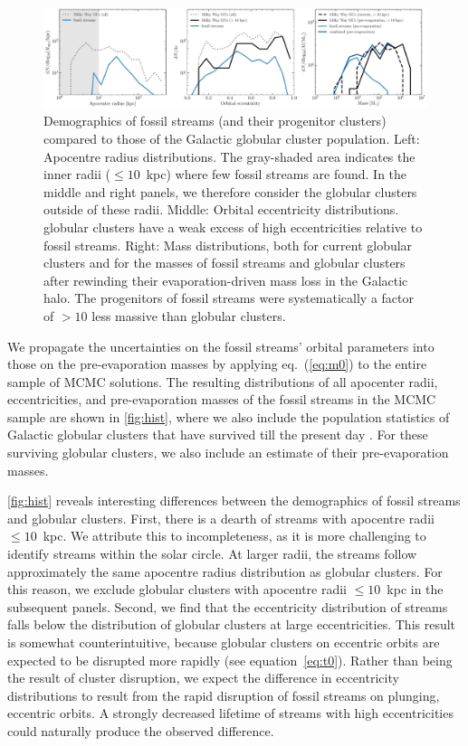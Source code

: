 \documentclass[twocolumn]{aastex63}
\begin{document}
\begin{figure}
\includegraphics[width=\hsize]{figures/distributions_mc.pdf}%
\caption{
\label{fig:hist}
Demographics of fossil streams (and their progenitor clusters) compared to those of the Galactic globular cluster population. Left: Apocentre radius distributions. The gray-shaded area indicates the inner radii ($\leq10$~kpc) where few fossil streams are found. In the middle and right panels, we therefore consider the globular clusters outside of these radii. Middle: Orbital eccentricity distributions. globular clusters have a weak excess of high eccentricities relative to fossil streams. Right: Mass distributions, both for current globular clusters and for the masses of fossil streams and globular clusters after rewinding their evaporation-driven mass loss in the Galactic halo. The progenitors of fossil streams were systematically a factor of $>10$ less massive than globular clusters.}
\end{figure}	
We propagate the uncertainties on the fossil streams' orbital parameters into those on the pre-evaporation masses by applying eq.~(\ref{eq:m0}) to the entire sample of MCMC solutions. The resulting distributions of all apocenter radii, eccentricities, and pre-evaporation masses of the fossil streams in the MCMC sample are shown in \autoref{fig:hist}, where we also include the population statistics of Galactic globular clusters that have survived till the present day \citep[2010 edition]{harris96}. For these surviving globular clusters, we also include an estimate of their pre-evaporation masses.

\autoref{fig:hist} reveals interesting differences between the demographics of fossil streams and globular clusters. First, there is a dearth of streams with apocentre radii $\leq10$~kpc. We attribute this to incompleteness, as it is more challenging to identify streams within the solar circle. At larger radii, the streams follow approximately the same apocentre radius distribution as globular clusters. For this reason, we exclude globular clusters with apocentre radii $\leq10$~kpc in the subsequent panels. Second, we find that the eccentricity distribution of streams falls below the distribution of globular clusters at large eccentricities. This result is somewhat counterintuitive, because globular clusters on eccentric orbits are expected to be disrupted more rapidly (see equation~\ref{eq:t0}). Rather than being the result of cluster disruption, we expect the difference in eccentricity distributions to result from the rapid disruption of fossil streams on plunging, eccentric orbits. A strongly decreased lifetime of streams with high eccentricities could naturally produce the observed difference.
\end{document}
